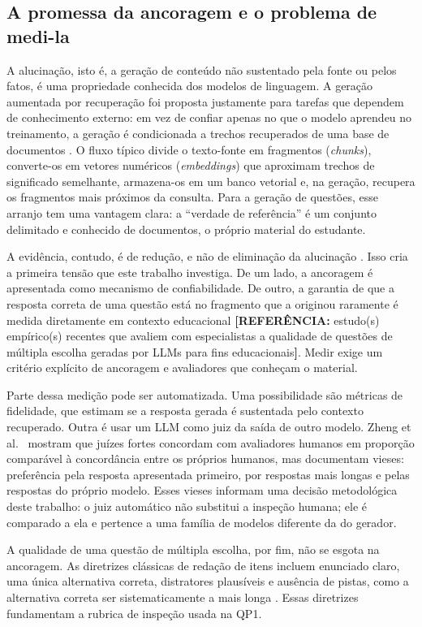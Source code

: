 \documentclass[portuguese,oneside]{tcc}
\newcommand{\estr}[1]{\emph{#1}}
\newcommand{\referencia}[1]{\textcolor{blue!60!black}{\textbf{[REFERÊNCIA:} #1\textbf{]}}}
\begin{document}
\subsection{A promessa da ancoragem e o problema de medi-la}

A alucinação, isto é, a geração de conteúdo não sustentado pela fonte ou pelos fatos, é uma propriedade conhecida dos modelos de linguagem. A geração aumentada por recuperação foi proposta justamente para tarefas que dependem de conhecimento externo: em vez de confiar apenas no que o modelo aprendeu no treinamento, a geração é condicionada a trechos recuperados de uma base de documentos \cite{LPP20}. O fluxo típico divide o texto-fonte em fragmentos (\estr{chunks}), converte-os em vetores numéricos (\estr{embeddings}) que aproximam trechos de significado semelhante, armazena-os em um banco vetorial e, na geração, recupera os fragmentos mais próximos da consulta. Para a geração de questões, esse arranjo tem uma vantagem clara: a ``verdade de referência'' é um conjunto delimitado e conhecido de documentos, o próprio material do estudante.

A evidência, contudo, é de redução, e não de eliminação da alucinação \cite{SPC21}. Isso cria a primeira tensão que este trabalho investiga. De um lado, a ancoragem é apresentada como mecanismo de confiabilidade. De outro, a garantia de que a resposta correta de uma questão está no fragmento que a originou raramente é medida diretamente em contexto educacional \referencia{estudo(s) empírico(s) recentes que avaliem com especialistas a qualidade de questões de múltipla escolha geradas por LLMs para fins educacionais}. Medir exige um critério explícito de ancoragem e avaliadores que conheçam o material.

Parte dessa medição pode ser automatizada. Uma possibilidade são métricas de fidelidade, que estimam se a resposta gerada é sustentada pelo contexto recuperado. Outra é usar um LLM como juiz da saída de outro modelo. Zheng et al.\ \cite{ZCS23} mostram que juízes fortes concordam com avaliadores humanos em proporção comparável à concordância entre os próprios humanos, mas documentam vieses: preferência pela resposta apresentada primeiro, por respostas mais longas e pelas respostas do próprio modelo. Esses vieses informam uma decisão metodológica deste trabalho: o juiz automático não substitui a inspeção humana; ele é comparado a ela e pertence a uma família de modelos diferente da do gerador.

A qualidade de uma questão de múltipla escolha, por fim, não se esgota na ancoragem. As diretrizes clássicas de redação de itens incluem enunciado claro, uma única alternativa correta, distratores plausíveis e ausência de pistas, como a alternativa correta ser sistematicamente a mais longa \cite{HDR02}. Essas diretrizes fundamentam a rubrica de inspeção usada na QP1.
\end{document}
